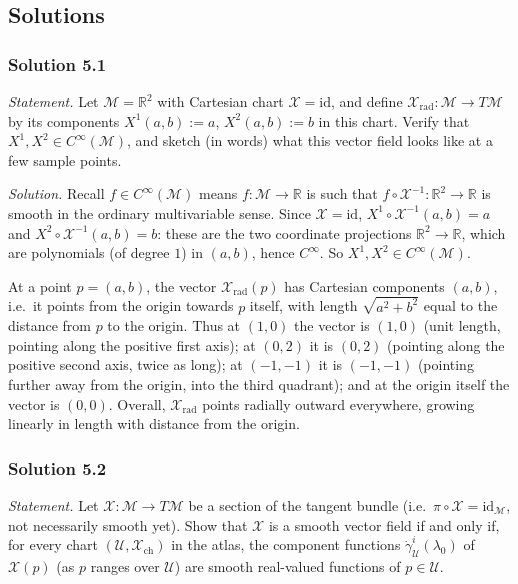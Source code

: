 \documentclass[11pt]{article}
\newcommand{\Cinf}{C^\infty(\mathcal M)}
\begin{document}
\subsection*{Solutions}

\subsubsection*{Solution 5.1}

\noindent\textit{Statement.} Let $\mathcal M=\mathbb R^2$ with Cartesian
chart $\mathcal X=\mathrm{id}$, and define $\mathcal
X_{\mathrm{rad}}:\mathcal M\to T\mathcal M$ by its components
$X^1(a,b):=a$, $X^2(a,b):=b$ in this chart. Verify that
$X^1,X^2\in\Cinf$, and sketch (in words) what this vector field looks like
at a few sample points.

\medskip
\noindent\textit{Solution.} Recall $f\in\Cinf$ means $f:\mathcal
M\to\mathbb R$ is such that $f\circ\mathcal X^{-1}:\mathbb R^2\to\mathbb R$
is smooth in the ordinary multivariable sense. Since $\mathcal
X=\mathrm{id}$, $X^1\circ\mathcal X^{-1}(a,b)=a$ and $X^2\circ\mathcal
X^{-1}(a,b)=b$: these are the two coordinate projections
$\mathbb R^2\to\mathbb R$, which are polynomials (of degree $1$) in
$(a,b)$, hence $C^\infty$. So $X^1,X^2\in\Cinf$.

At a point $p=(a,b)$, the vector $\mathcal X_{\mathrm{rad}}(p)$ has
Cartesian components $(a,b)$, i.e.\ it points from the origin towards $p$
itself, with length $\sqrt{a^2+b^2}$ equal to the distance from $p$ to the
origin. Thus at $(1,0)$ the vector is $(1,0)$ (unit length, pointing along
the positive first axis); at $(0,2)$ it is $(0,2)$ (pointing along the
positive second axis, twice as long); at $(-1,-1)$ it is $(-1,-1)$
(pointing further away from the origin, into the third quadrant); and at
the origin itself the vector is $(0,0)$. Overall, $\mathcal
X_{\mathrm{rad}}$ points radially outward everywhere, growing linearly in
length with distance from the origin.

\subsubsection*{Solution 5.2}

\noindent\textit{Statement.} Let $\mathcal X:\mathcal M\to T\mathcal M$ be
a section of the tangent bundle (i.e.\ $\pi\circ\mathcal
X=\mathrm{id}_{\mathcal M}$, not necessarily smooth yet). Show that
$\mathcal X$ is a smooth vector field if and only if, for every chart
$(\mathcal U,\mathcal X_{\mathrm{ch}})$ in the atlas, the component
functions $\dot\gamma^i_{\mathcal U}(\lambda_0)$ of $\mathcal X(p)$ (as $p$
ranges over $\mathcal U$) are smooth real-valued functions of $p\in
\mathcal U$.
\end{document}
